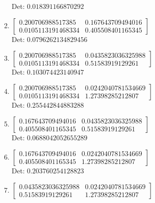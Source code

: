 \documentclass[12pt]{article}
\begin{document}
\begin{enumerate}
Det: $0.018391166870292$\\

\item $\displaystyle \left[\begin{matrix}0.200706988517385 & 0.167643709494016\\0.0105113191468334 & 0.405508401165345\end{matrix}\right]$\\

Det: $0.0796262134829456$\\

\item $\displaystyle \left[\begin{matrix}0.200706988517385 & 0.0435823036325988\\0.0105113191468334 & 0.51583919129261\end{matrix}\right]$\\

Det: $0.103074423140947$\\

\item $\displaystyle \left[\begin{matrix}0.200706988517385 & 0.0242040781534669\\0.0105113191468334 & 1.27398285212807\end{matrix}\right]$\\

Det: $0.255442844883288$\\

\item $\displaystyle \left[\begin{matrix}0.167643709494016 & 0.0435823036325988\\0.405508401165345 & 0.51583919129261\end{matrix}\right]$\\

Det: $0.0688042052655289$\\

\item $\displaystyle \left[\begin{matrix}0.167643709494016 & 0.0242040781534669\\0.405508401165345 & 1.27398285212807\end{matrix}\right]$\\

Det: $0.203760254128823$\\

\item $\displaystyle \left[\begin{matrix}0.0435823036325988 & 0.0242040781534669\\0.51583919129261 & 1.27398285212807\end{matrix}\right]$\\


\end{enumerate}
\end{document}
